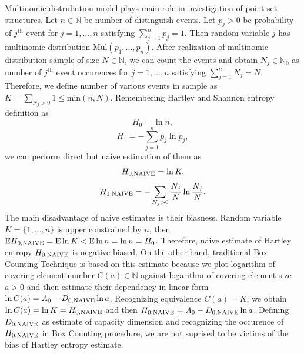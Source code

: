 \documentclass[a4paper,10pt]{article}
\begin{document}
Multinomic distrubution model plays main role in investigation of point set structures. Let $n \in \mathbb{N}$ be number of distinguish events. Let $p_{j} > 0$ be probability of $j^{\text{th}}$ event for $j = 1,...,n$ satisfying $ \sum_{j=1}^{n} p_{j} =1$. Then random variable $j$ has multinomic distribution $\text{Mul}(p_{1},...,p_{n})$. After realization of multinomic distribution sample of size $N \in \mathbb{N}$, we can count the events and obtain $N_{j} \in \mathbb{N}_{0}$ as number of $j^{\text{th}}$ event occurences for $j=1,...,n$ satisfying $\sum_{j=1}^{n} N_{j} = N$. Therefore, we define number of various events in sample as $K = \sum_{N_{j}>0} 1 \le \text{min}(n,N)$. Remembering Hartley and Shannon entropy definition as
\begin{equation} 
\label{eq:hnula}
H_{0}=\ln{n},
\end{equation} 
\begin{equation} 
\label{eq:hjedna}
H_{1}=-\sum_{j=1}^{n} p_{j}\ln{p_{j}},
\end{equation}   
we can perform direct but naive estimation of them as
\begin{equation} 
\label{eq:hnulaap}
H_{0,\mbox{\scriptsize{NAIVE}}}=\ln{K},
\end{equation} 
\begin{equation} 
\label{eq:hjednaap}
H_{1,\mbox{\scriptsize{NAIVE}}}=-\sum_{N_{j}>0} \frac{N_{j}}{N}\ln{\frac{N_{j}}{N}}.
\end{equation}   
The main disadvantage of naive estimates is their biasness. Random variable $K= \{ 1,...,n \} $ is upper constrained by $n$, then $\text{E}H_{0,\mbox{\scriptsize{NAIVE}}} = \text{E}\ln{K} < \text{E}\ln{n} = \ln{n} = H_{0}$. Therefore, naive estimate of Hartley entropy $H_{0,\mbox{\scriptsize{NAIVE}}}$ is negative biased. On the other hand, traditional Box Counting Technique is based on this estimate because we plot logarithm of covering element number $C(a) \in \mathbb{N}$ against logarithm of covering element size $a > 0$ and then estimate their dependency in linear form $\ln{C(a)} = A_{0} - D_{0,\mbox{\scriptsize{NAIVE}}}\ln{a}$. Recognizing equivalence $C(a) = K$, we obtain $\ln{C(a)} = \ln{K} = H_{0,\mbox{\scriptsize{NAIVE}}}$ and then $H_{0,\mbox{\scriptsize{NAIVE}}} = A_{0} - D_{0,\mbox{\scriptsize{NAIVE}}}\ln{a}$. Defining $D_{0,\mbox{\scriptsize{NAIVE}}}$ as estimate of capacity dimension and recognizing the occurence of $H_{0,\mbox{\scriptsize{NAIVE}}}$ in Box Counting procedure, we are not suprised to be victims of the bias of Hartley entropy estimate.\\ 
\end{document}
